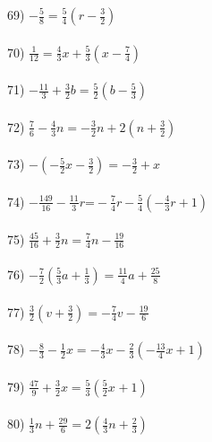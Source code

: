 \documentclass[12pt]{article}
\theoremstyle{definition}
\begin{document}
\begin{multicols}{2}
  69) $- \frac{5}{8} = \frac{5}{4} (r - \frac{3}{2})$\\ \ \\
  70) $\frac{1}{12} = \frac{4}{3} x + \frac{5}{3} (x - \frac{7}{4})$\\ \ \\
  71) $- \frac{11}{3} + \frac{3}{2} b = \frac{5}{2} (b - \frac{5}{3})$\\ \ \\
  72) $\frac{7}{6} - \frac{4}{3} n = - \frac{3}{2} n + 2 (n + \frac{3}{2})$\\ \ \\
  73) $- (- \frac{5}{2} x - \frac{3}{2}) = - \frac{3}{2} + x$\\ \ \\
  74) $- \frac{149}{16} - \frac{11}{3} r \text{=} - \frac{7}{4} r -  \frac{5}{4} (- \frac{4}{3} r + 1)$\\ \ \\
  75) $\frac{45}{16} + \frac{3}{2} n = \frac{7}{4} n - \frac{19}{16}$\\ \ \\
  76) $- \frac{7}{2} (\frac{5}{3} a + \frac{1}{3}) = \frac{11}{4} a +\frac{25}{8}$\\ \ \\
  77) $\frac{3}{2} (v + \frac{3}{2}) = - \frac{7}{4} v - \frac{19}{6}$\\ \ \\
  78) $- \frac{8}{3} - \frac{1}{2} x = - \frac{4}{3} x - \frac{2}{3} (-\frac{13}{4} x + 1)$\\ \ \\
  79) $\frac{47}{9} + \frac{3}{2} x = \frac{5}{3} (\frac{5}{2} x_{} + 1)$\\ \ \\
  80) $\frac{1}{3} n + \frac{29}{6} = 2 (\frac{4}{3} n + \frac{2}{3})$ 
\end{multicols}
\newpage
\ \newpage
\end{document}
